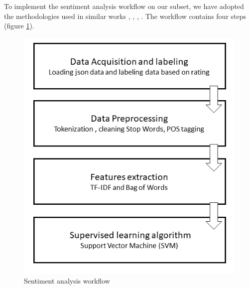 \documentclass[preprint,3p,onecolumn]{elsarticle}
\begin{document}
\par To implement the sentiment analysis workflow on our subset, we have adopted the methodologies used in similar works \citep{elli2016amazon}, \citep{xu2015sentiment}, \citep{rain2013sentiment}, \citep{bhatt2015amazon}. The workflow contains four steps (figure \ref{saworkflow}).

\begin{figure}[H]
\centering
\includegraphics[scale=.5]{saworkflow}
\caption{Sentiment analysis workflow}
\label{saworkflow}
\end{figure}
\end{document}

